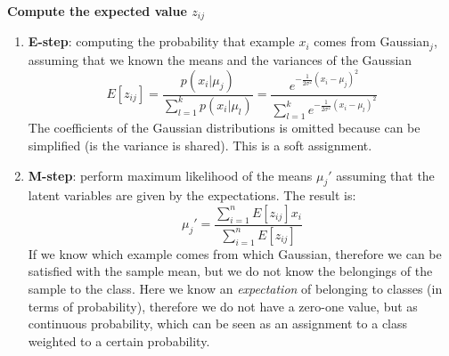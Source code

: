            \textbf{Compute the expected value $z_{ij}$}
            \begin{enumerate}
                \item \textbf{E-step}: computing the probability that example $x_i$ comes from Gaussian$_j$, assuming that we known the means and the variances of the Gaussian
                $$E[z_{ij}] = \frac{p(x_i|\mu_j)}{\sum _{l=1} ^ k p(x_i|\mu_l)} =   
                \frac   {e^{- \frac{1}{2 \sigma^ 2} (x_i -\mu_j)^2 }}
                        { \sum _{l=1} ^ k e^{- \frac{1}{2 \sigma^ 2} (x_i - \mu_l)^2 }}$$
                The coefficients of the Gaussian distributions is omitted because can be simplified (is the variance is shared).
                This is a soft assignment. 
                \item \textbf{M-step}: perform maximum likelihood of the means $\mu_j '$ assuming that the latent variables are given by the expectations. The result is:
                $$\mu_j ' = \frac{ \sum_{i=1}^ n E[z_{ij}] x_i} {\sum _{i=1} ^ n E[z_{ij}]}$$
                If we know which example comes from which Gaussian, therefore we can be satisfied with the sample mean, but we do not know the belongings of the sample to the class. Here we know an \textit{expectation} of belonging to classes (in terms of probability), therefore we do not have a zero-one value, but as continuous probability, which can be seen as an assignment to a class weighted to a certain probability.
            \end{enumerate}
            
